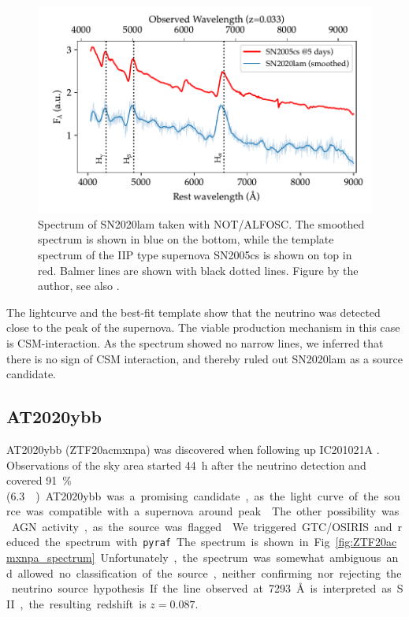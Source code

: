 \documentclass[
    a4paper, %
    fontsize=10pt, %
    twoside=true, %
    numbers=noenddot, %
    fontmethod=tex,
]{kaobook}
\begin{document}
\begin{figure}[h!]
    \includegraphics[width=1\textwidth]{fu/ZTF20abbpkpa_not_spectrum.pdf}
    \caption[SN2020lam spectrum]{Spectrum of SN2020lam taken with NOT/ALFOSC. The smoothed spectrum is shown in blue on the bottom, while the template spectrum of the IIP type supernova SN2005cs is shown on top in red. Balmer lines are shown with black dotted lines. Figure by the author, see also \cite{Stein2023a}.}
\end{figure}
The lightcurve and the best-fit template show that the neutrino was detected close to the peak of the supernova. The viable production mechanism in this case is CSM-interaction. As the spectrum showed no narrow lines, we inferred that there is no sign of CSM interaction, and thereby ruled out SN2020lam as a source candidate.

\subsection{AT2020ybb}
AT2020ybb (ZTF20acmxnpa) was discovered when following up IC201021A . Observations of the sky area started \SI{44}{\hour} after the neutrino detection and covered \SI{91}{\percent} (\SI{6.3}{\square\deg}).

AT2020ybb was a promising candidate, as the light curve of the source was compatible with a supernova around peak . The other possibility was AGN activity, as the source was flagged 

We triggered GTC/OSIRIS and reduced the spectrum with \texttt{pyraf}. The spectrum is shown in Fig. \ref{fig:ZTF20acmxnpa_spectrum}. Unfortunately, the spectrum was somewhat ambiguous and allowed no classification of the source, neither confirming nor rejecting the neutrino source hypothesis. If the line observed at \SI{7293}{\angstrom} is interpreted as SII, the resulting redshift is $z=0.087$.
\end{document}
